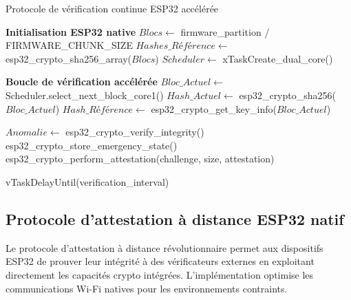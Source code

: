 \begin{algorithm}
\caption{Protocole de vérification continue ESP32 accélérée}
\label{alg:continuous-verification-esp32}
\begin{algorithmic}[1]
\State \textbf{Initialisation ESP32 native}
\State $Blocs \leftarrow$ firmware\_partition / FIRMWARE\_CHUNK\_SIZE
\State $Hashes\_Référence \leftarrow$ esp32\_crypto\_sha256\_array($Blocs$)
\State $Scheduler \leftarrow$ xTaskCreate\_dual\_core()

\State \textbf{Boucle de vérification accélérée}
    \State $Bloc\_Actuel \leftarrow$ Scheduler.select\_next\_block\_core1()
    \State $Hash\_Actuel \leftarrow$ esp32\_crypto\_sha256($Bloc\_Actuel$)
    \State $Hash\_Référence \leftarrow$ esp32\_crypto\_get\_key\_info($Bloc\_Actuel$)
    
        \State $Anomalie \leftarrow$ esp32\_crypto\_verify\_integrity()
            \State esp32\_crypto\_store\_emergency\_state()
            \State esp32\_crypto\_perform\_attestation(challenge, size, attestation)
        \EndIf
    \EndIf
    
    \State vTaskDelayUntil(verification\_interval)
\EndWhile
\end{algorithmic}
\end{algorithm}

\subsection{Protocole d'attestation à distance ESP32 natif}

Le protocole d'attestation à distance révolutionnaire permet aux dispositifs ESP32 de prouver leur intégrité à des vérificateurs externes en exploitant directement les capacités crypto intégrées. L'implémentation optimise les communications Wi-Fi natives pour les environnements contraints.


